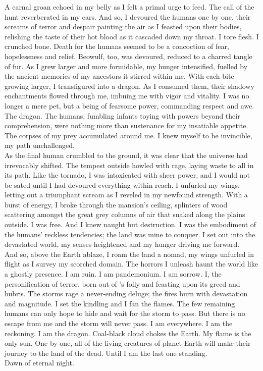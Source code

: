 A carnal groan echoed in my belly as I felt a primal urge to feed. The call of the hunt reverberated in my ears. And so, I devoured the humans one by one, their screams of terror and despair painting the air as I feasted upon their bodies, relishing the taste of their hot blood as it cascaded down my throat. I tore flesh. I crunched bone. Death for the humans seemed to be a concoction of fear, hopelessness and relief. Beowulf, too, was devoured, reduced to a charred tangle of fur. As I grew larger and more formidable, my hunger intensified, fuelled by the ancient memories of my ancestors it stirred within me. With each bite growing larger, I transfigured into a dragon. As I consumed them, their shadowy enchantments flowed through me, imbuing me with vigor and vitality. I was no longer a mere pet, but a being of fearsome power, commanding respect and awe. The dragon. The humans, fumbling infants toying with powers beyond their comprehension, were nothing more than sustenance for my insatiable appetite. The corpses of my prey accumulated around me. I knew myself to be invincible, my path unchallenged. \\

As the final human crumbled to the ground, it was clear that the universe had irrevocably shifted. The tempest outside howled with rage, laying waste to all in its path. Like the tornado, I was intoxicated with sheer power, and I would not be sated until I had devoured everything within reach. I unfurled my wings, letting out a triumphant scream as I reveled in my newfound strength. With a burst of energy, I broke through the mansion's ceiling, splinters of wood scattering amongst the great grey columns of air that snaked along the plains outside. I was free. And I knew naught but destruction. I was the embodiment of the humans' reckless tendencies; the land was mine to conquer. I set out into the devastated world, my senses heightened and my hunger driving me forward. \\

And so, above the Earth ablaze, I roam the land a nomad, my wings unfurled in flight as I survey my scorched domain. The horrors I unleash haunt the world like a ghostly presence. I am ruin. I am pandemonium. I am sorrow. I, the personification of terror, born out of 's folly and feasting upon its greed and hubris. The storms rage a never-ending deluge; the fires burn with devastation and magnitude. I set the kindling and I fan the flames. The few remaining humans can only hope to hide and wait for the storm to pass. But there is no escape from me and the storm will never pass. I am everywhere. I am the reckoning. I am the dragon. Coal-black cloud chokes the Earth. My flame is the only sun. One by one, all of the living creatures of planet Earth will make their journey to the land of the dead. Until I am the last one standing. \\

Dawn of eternal night. \\
